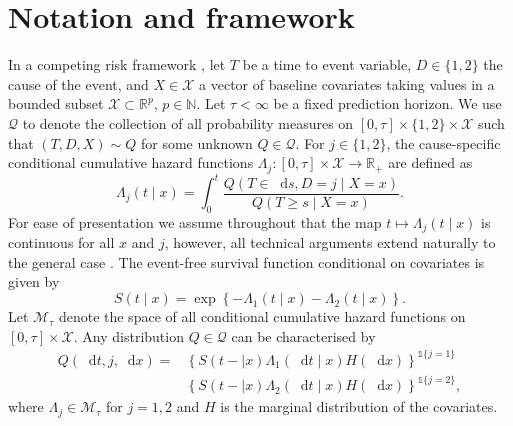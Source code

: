 \documentclass[a4paper,danish]{article}
\theoremstyle{plain} %
\numberwithin{theorem}{section}
\theoremstyle{definition} %
\theoremstyle{remark}
\newcommand{\R}{\mathbb{R}}
\newcommand{\N}{\mathbb{N}}
\newcommand*\diff{\mathop{}\!\mathrm{d}}
\newcommand{\1}{\mathds{1}}
\begin{document}
\section{Notation and framework}
\label{sec:framework}

In a competing risk framework \citep{andersen2012statistical}, let \(
T\) be a time to event variable, \(D\in\{1,2\}\) the cause of the
event, and $X \in \mathcal{X}$ a vector of baseline covariates taking
values in a bounded subset \( \mathcal{X} \subset \R^p \), \( p\in\N
\). Let $\tau< \infty$ be a fixed prediction horizon. We use \(
\mathcal{Q} \) to denote the collection of all probability measures on
\( [0,\tau] \times \{1,2\}\times \mathcal{X} \) such that \( (T, D, X)
\sim Q \) for some unknown \( Q \in \mathcal{Q} \). For
\(j\in\{1,2\}\), the cause-specific conditional cumulative hazard
functions \( \Lambda_{j} \colon [0, \tau] \times \mathcal{X}
\rightarrow \R_+ \) are defined as
\begin{equation*}
  \Lambda_{j}(t \mid x) = \int_0^t\frac{  Q(T \in \diff s, D=j \mid X=x )}{Q(T \geq s \mid X=x )}.
\end{equation*} For ease of presentation we assume throughout that the
map \( t\mapsto \Lambda_j(t \mid x) \) is continuous for all \( x \)
and \( j \), however, 
all technical arguments extend naturally to the general case \citep{andersen2012statistical}.
The event-free survival function conditional on covariates is given by
\begin{equation}
  \label{eq:surv-def}
  S(t \mid x)=\exp\left\{-\Lambda_{1}(t \mid x)-\Lambda_{2}(t \mid x)\right\}.
\end{equation}
Let \( \mathcal{M}_{\tau}\) denote the space of all conditional cumulative hazard
functions on \( [0,\tau] \times\mathcal{X}\). Any distribution
\( Q \in \mathcal{Q} \) can be characterised by
\begin{equation*}
  \label{eq:parametrizeQ}
  \begin{split}
    Q(\diff t,j,\diff x)=& \left\{S(t- \mid x)\Lambda_1(\diff t \mid x)H(\diff x)\right\}^{\1{\{j=1\}}}\\
                         &  \left\{S(t- \mid x)\Lambda_2(\diff t \mid x)H(\diff x)\right\}^{\1{\{j=2\}}},
  \end{split}
\end{equation*}
where \(\Lambda_{j} \in \mathcal{M}_{\tau}\) for \(j=1,2\) and \(H\) is the marginal
distribution of the covariates.
\end{document}
